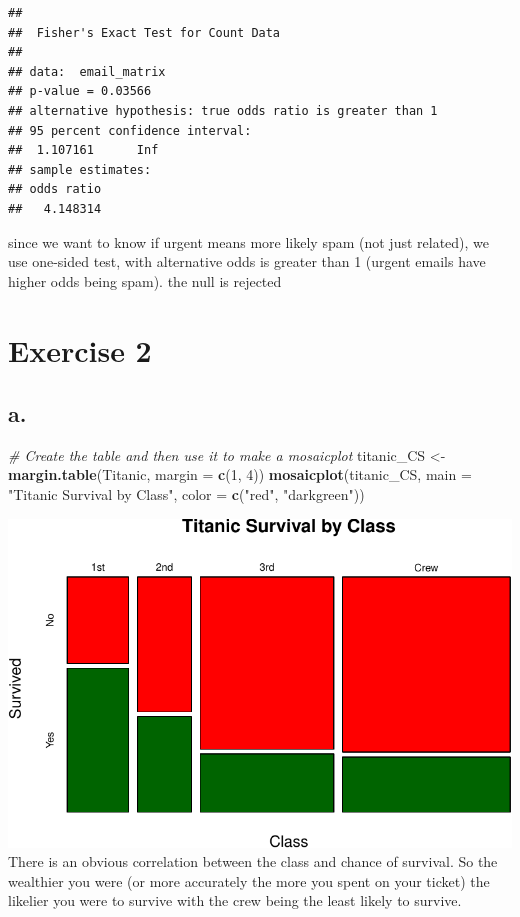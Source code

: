 \documentclass[
]{article}
\newenvironment{Shaded}{\begin{snugshade}}{\end{snugshade}}
\newcommand{\AttributeTok}[1]{\textcolor[rgb]{0.13,0.29,0.53}{#1}}
\newcommand{\CommentTok}[1]{\textcolor[rgb]{0.56,0.35,0.01}{\textit{#1}}}
\newcommand{\DecValTok}[1]{\textcolor[rgb]{0.00,0.00,0.81}{#1}}
\newcommand{\FunctionTok}[1]{\textcolor[rgb]{0.13,0.29,0.53}{\textbf{#1}}}
\newcommand{\NormalTok}[1]{#1}
\newcommand{\OtherTok}[1]{\textcolor[rgb]{0.56,0.35,0.01}{#1}}
\newcommand{\StringTok}[1]{\textcolor[rgb]{0.31,0.60,0.02}{#1}}
\begin{document}
\begin{verbatim}
## 
##  Fisher's Exact Test for Count Data
## 
## data:  email_matrix
## p-value = 0.03566
## alternative hypothesis: true odds ratio is greater than 1
## 95 percent confidence interval:
##  1.107161      Inf
## sample estimates:
## odds ratio 
##   4.148314
\end{verbatim}

since we want to know if urgent means more likely spam (not just
related), we use one-sided test, with alternative odds is greater than 1
(urgent emails have higher odds being spam). the null is rejected

\section{Exercise 2}\label{exercise-2}

\subsection{a.}\label{a.-1}

\begin{Shaded}
\begin{Highlighting}[]
\CommentTok{\# Create the table and then use it to make a mosaicplot}
\NormalTok{titanic\_CS }\OtherTok{\textless{}{-}} \FunctionTok{margin.table}\NormalTok{(Titanic, }\AttributeTok{margin =} \FunctionTok{c}\NormalTok{(}\DecValTok{1}\NormalTok{, }\DecValTok{4}\NormalTok{))}
\FunctionTok{mosaicplot}\NormalTok{(titanic\_CS, }\AttributeTok{main =} \StringTok{"Titanic Survival by Class"}\NormalTok{, }\AttributeTok{color =} \FunctionTok{c}\NormalTok{(}\StringTok{"red"}\NormalTok{, }\StringTok{"darkgreen"}\NormalTok{))}
\end{Highlighting}
\end{Shaded}

\includegraphics{SDA_A6_files/figure-latex/unnamed-chunk-4-1.pdf} There
is an obvious correlation between the class and chance of survival. So
the wealthier you were (or more accurately the more you spent on your
ticket) the likelier you were to survive with the crew being the least
likely to survive.
\end{document}
